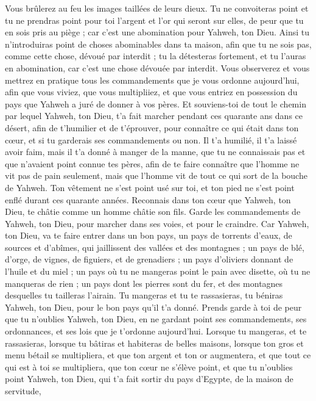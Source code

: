 \begin{multicols}{2}
Vous brûlerez au feu les images taillées de leurs dieux. Tu ne convoiteras point et tu ne prendras point pour toi l'argent et l'or qui seront sur elles, de peur que tu en sois pris au piège ; car c'est une abomination pour Yahweh, ton Dieu.
Ainsi tu n'introduiras point de choses abominables dans ta maison, afin que tu ne sois pas, comme cette chose, dévoué par interdit ; tu la détesteras fortement, et tu l’auras en abomination, car c'est une chose dévouée par interdit.
\VerseOne{}Vous observerez et vous mettrez en pratique tous les commandements que je vous ordonne aujourd'hui, afin que vous viviez, que vous multipliiez, et que vous entriez en possession du pays que Yahweh a juré de donner à vos pères.
Et souviens-toi de tout le chemin par lequel Yahweh, ton Dieu, t'a fait marcher pendant ces quarante ans dans ce désert, afin de t'humilier et de t'éprouver, pour connaître ce qui était dans ton cœur, et si tu garderais ses commandements ou non.
Il t'a humilié, il t'a laissé avoir faim, mais il t'a donné à manger de la manne, que tu ne connaissais pas et que n’avaient point connue tes pères, afin de te faire connaître que l'homme ne vit pas de pain seulement, mais que l'homme vit de tout ce qui sort de la bouche de Yahweh.
Ton vêtement ne s'est point usé sur toi, et ton pied ne s’est point enflé durant ces quarante années.
Reconnais dans ton cœur que Yahweh, ton Dieu, te châtie comme un homme châtie son fils\FTNT{}.
Garde les commandements de Yahweh, ton Dieu, pour marcher dans ses voies, et pour le craindre.
Car Yahweh, ton Dieu, va te faire entrer dans un bon pays, un pays de torrents d'eaux, de sources et d'abîmes, qui jaillissent des vallées et des montagnes ;
un pays de blé, d'orge, de vignes, de figuiers, et de grenadiers ; un pays d'oliviers donnant de l'huile et du miel ;
un pays où tu ne mangeras point le pain avec disette, où tu ne manqueras de rien ; un pays dont les pierres sont du fer, et des montagnes desquelles tu tailleras l'airain.
Tu mangeras et tu te rassasieras, tu béniras Yahweh, ton Dieu, pour le bon pays qu'il t'a donné.
Prends garde à toi de peur que tu n'oublies Yahweh, ton Dieu, en ne gardant point ses commandements, ses ordonnances, et ses lois que je t’ordonne aujourd'hui.
Lorsque tu mangeras, et te rassasieras, lorsque tu bâtiras et habiteras de belles maisons,
lorsque ton gros et menu bétail se multipliera, et que ton argent et ton or augmentera, et que tout ce qui est à toi se multipliera,
que ton cœur ne s'élève point, et que tu n'oublies point Yahweh, ton Dieu, qui t’a fait sortir du pays d'Egypte, de la maison de servitude,

\end{multicols}
